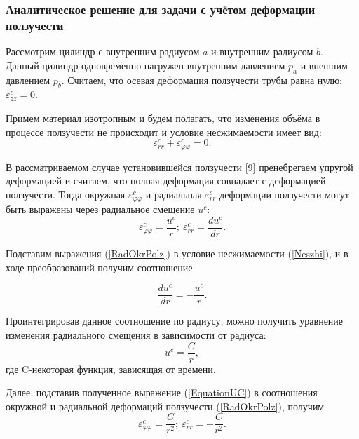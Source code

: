 \documentclass[a4paper,14pt]{extarticle}
\begin{document}
\newpage

\subsubsection{Аналитическое решение для задачи с учётом деформации ползучести}
\normalsize
Рассмотрим цилиндр с внутренним радиусом $a$ и внутренним радиусом $b$. Данный цилиндр одновременно нагружен внутренним давлением $p_a$ и внешним давлением $p_b$. Считаем, что осевая деформация ползучести трубы равна нулю: $\varepsilon^{c}_{zz}=0$.

Примем материал изотропным и будем полагать, что изменения объёма в процессе ползучести не происходит и условие несжимаемости  имеет вид:
\begin{equation}\label{Neszhi}
\varepsilon^c_{rr}+\varepsilon^c_{\varphi\varphi}=0.
\end{equation}

В рассматриваемом случае установившейся ползучести [9] пренебрегаем упругой деформацией и считаем, что полная деформация совпадает с деформацией ползучести. Тогда окружная $\varepsilon_{\varphi\varphi}^{c}$ и радиальная $\varepsilon_{rr}^{c}$ деформации ползучести могут быть выражены через радиальное смещение $u^{c}$:
\begin{equation}\label{RadOkrPolz}
\varepsilon_{\varphi\varphi}^{c}=\dfrac{u^{c}}{r}; \ \varepsilon_{rr}^{c}=\dfrac{d u^{c}}{d r}.
\end{equation}

Подставим выражения (\ref{RadOkrPolz}) в условие несжимаемости (\ref{Neszhi}), и в ходе преобразований получим соотношение

\begin{equation}
\dfrac{d u^{c}}{d r}=-\dfrac{u^{c}}{r}.
\end{equation}

Проинтегрировав данное соотношение по радиусу, можно получить уравнение изменения радиального смещения в зависимости от радиуса:
\begin{equation}\label{EquationUC}
u^{c}=\dfrac{C}{r},
\end{equation}
где C-некоторая функция, зависящая от времени. 

Далее, подставив полученное выражение (\ref{EquationUC}) в соотношения окружной и радиальной деформаций ползучести (\ref{RadOkrPolz}), получим
\begin{equation}\label{EquationsEPSCRT}
\varepsilon_{\varphi\varphi}^{c}=\frac{C}{r^2}; \ \varepsilon_{rr}^{c}=-\frac{C}{r^2}.
\end{equation}
\end{document}
